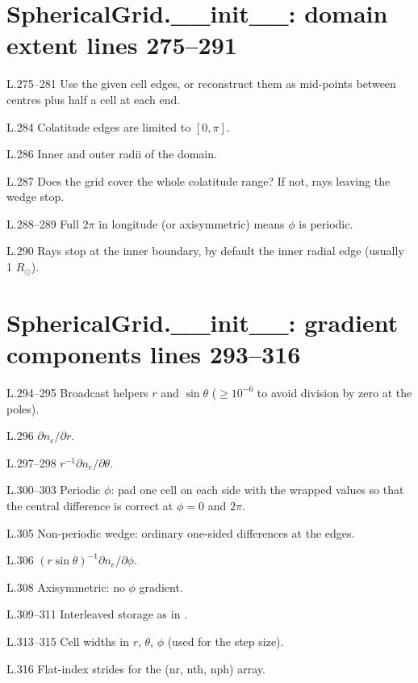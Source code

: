 \section*{\normalsize SphericalGrid.\_\_init\_\_: domain extent \hfill{\small\mdseries\color{gray}lines 275--291}}

\begin{lines}
\item[L.275–281] Use the given cell edges, or reconstruct them as mid-points between centres plus half a cell at each end.
\item[L.284] Colatitude edges are limited to $[0,\pi]$.
\item[L.286] Inner and outer radii of the domain.
\item[L.287] Does the grid cover the whole colatitude range? If not, rays leaving the wedge stop.
\item[L.288–289] Full $2\pi$ in longitude (or axisymmetric) means $\phi$ is periodic.
\item[L.290] Rays stop at the inner boundary, by default the inner radial edge (usually 1 $R_\odot$).
\end{lines}
\section*{\normalsize SphericalGrid.\_\_init\_\_: gradient components \hfill{\small\mdseries\color{gray}lines 293--316}}

\begin{lines}
\item[L.294–295] Broadcast helpers $r$ and $\sin\theta$ ($\ge10^{-6}$ to avoid division by zero at the poles).
\item[L.296] $\partial n_e/\partial r$.
\item[L.297–298] $r^{-1}\partial n_e/\partial\theta$.
\item[L.300–303] Periodic $\phi$: pad one cell on each side with the wrapped values so that the central difference is correct at $\phi=0$ and $2\pi$.
\item[L.305] Non-periodic wedge: ordinary one-sided differences at the edges.
\item[L.306] $(r\sin\theta)^{-1}\partial n_e/\partial\phi$.
\item[L.308] Axisymmetric: no $\phi$ gradient.
\item[L.309–311] Interleaved storage as in .
\item[L.313–315] Cell widths in $r$, $\theta$, $\phi$ (used for the step size).
\item[L.316] Flat-index strides for the (nr, nth, nph) array.
\end{lines}
